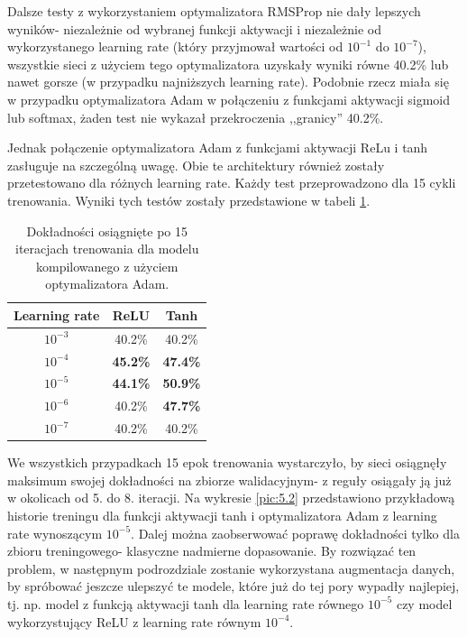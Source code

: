 Dalsze testy z wykorzystaniem optymalizatora RMSProp nie dały lepszych wyników- niezależnie od wybranej funkcji aktywacji i niezależnie od wykorzystanego learning rate (który przyjmował wartości od $10^{-1}$ do $10^{-7}$), wszystkie sieci z użyciem tego optymalizatora uzyskały wyniki równe 40.2\% lub nawet gorsze (w przypadku najniższych learning rate). Podobnie rzecz miała się w przypadku optymalizatora Adam w połączeniu z funkcjami aktywacji sigmoid lub softmax, żaden test nie wykazał przekroczenia ,,granicy'' 40.2\%.

Jednak połączenie optymalizatora Adam z funkcjami aktywacji ReLu i tanh zasługuje na szczególną uwagę. Obie te architektury również zostały przetestowano dla różnych learning rate. Każdy test przeprowadzono dla 15 cykli trenowania. Wyniki tych testów zostały przedstawione w tabeli \ref{tab:5.2}.

\begin{table}[H]
  \centering
  \caption{Dokładności osiągnięte po 15 iteracjach trenowania dla modelu kompilowanego z użyciem optymalizatora Adam.}
    \begin{tabular}{ |c|c|c| }
    \hline
    Learning rate & ReLU & Tanh \\
    \hline
    $10^{-3}$ & 40.2\% & 40.2\% \\
    $10^{-4}$ & \textbf{45.2\%} & \textbf{47.4\%} \\
    $10^{-5}$ & \textbf{44.1\%} & \textbf{50.9\%} \\
    $10^{-6}$ & 40.2\% & \textbf{47.7\%} \\
    $10^{-7}$ & 40.2\% & 40.2\% \\
    \hline
    \end{tabular}
  \label{tab:5.2}
\end{table}

We wszystkich przypadkach 15 epok trenowania wystarczyło, by sieci osiągnęły maksimum swojej dokładności na zbiorze walidacyjnym- z reguły osiągały ją już w okolicach od 5. do 8. iteracji. Na wykresie \ref{pic:5.2} przedstawiono przykładową historie treningu dla funkcji aktywacji tanh i optymalizatora Adam z learning rate wynoszącym $10^{-5}$. Dalej można zaobserwować poprawę dokładności tylko dla zbioru treningowego- klasyczne nadmierne dopasowanie. By rozwiązać ten problem, w następnym podrozdziale zostanie wykorzystana augmentacja danych, by spróbować jeszcze ulepszyć te modele, które już do tej pory wypadły najlepiej, tj. np. model z funkcją aktywacji tanh dla learning rate równego $10^{-5}$ czy model wykorzystujący ReLU z learning rate równym $10^{-4}$.

